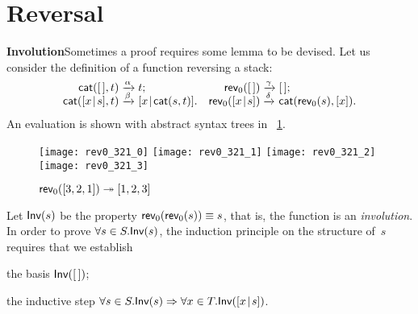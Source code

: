 \section{Reversal}
\label{sec:reversal}


\textbf{Involution}\quad Sometimes a
proof requires some lemma to be devised. Let us consider the
definition of a function
\label{def:rev0}
reversing a stack:
\begin{equation*}
\begin{array}{@{}r@{\;}l@{\;}lr@{\;}l@{\;}l@{}}
  \fun{cat}(\el,t)\index{cat@\fun{cat/2}}
& \xrightarrow{\smash{\alpha}} & t;
& \fun{rev}_0(\el)
& \xrightarrow{\smash{\gamma}} & \el;\\
  \fun{cat}(\cons{x}{s},t)
& \xrightarrow{\smash{\beta}} & \cons{x}{\fun{cat}(s,t)}.
& \fun{rev}_0(\cons{x}{s})
& \xrightarrow{\smash{\delta}} & \fun{cat}(\fun{rev}_0(s),[x]).
\end{array}
\end{equation*}
An evaluation is shown with abstract syntax trees in
\fig~\ref{fig:rev0_321}.
\begin{figure}[!b]
\centering
\texttt{[image: rev0\_321\_0]}
\texttt{[image: rev0\_321\_1]}
\texttt{[image: rev0\_321\_2]}
\texttt{[image: rev0\_321\_3]}
\caption{\(\textsf{rev}_0([3,2,1]) \twoheadrightarrow [1,2,3]\)
\label{fig:rev0_321}}
\end{figure}
Let \(\textsf{Inv}({s})\) be the property
\(\textsf{rev}_0(\textsf{rev}_0(s)) \equiv s\), that is, the function
 is an
\emph{involution}. In order to prove
\(\forall s \in S.\textsf{Inv}({s})\), the induction principle on the
structure of~\(s\) requires that we
establish
\begin{itemize*}

  \item the basis \(\textsf{Inv}({[\,]})\);

  \item the inductive step \(\forall s \in S.\textsf{Inv}({s})
    \Rightarrow \forall x \in T.\textsf{Inv}({[{x}\!\mid\!{s}]})\).

\end{itemize*}
